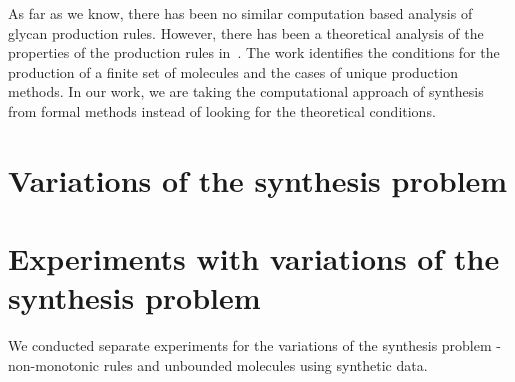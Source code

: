 \documentclass{llncs}
\begin{document}
As far as we know, there has been no similar computation based analysis of glycan production rules.
%
However, there has been a theoretical analysis of the properties of the production
rules in~\cite{Jaiman2018}. The work identifies the conditions for the production
of a finite set of molecules and the cases of unique production methods.
%
In our work, we are taking the computational approach of synthesis from formal methods
instead of looking for the theoretical conditions.

\section{Variations of the synthesis problem}
\label{sec:variations}


\section{Experiments with variations of the synthesis problem}
\label{sec:ex-variants}
We conducted separate experiments for the variations of the synthesis problem - non-monotonic rules and unbounded molecules using synthetic data.
%
\end{document}
